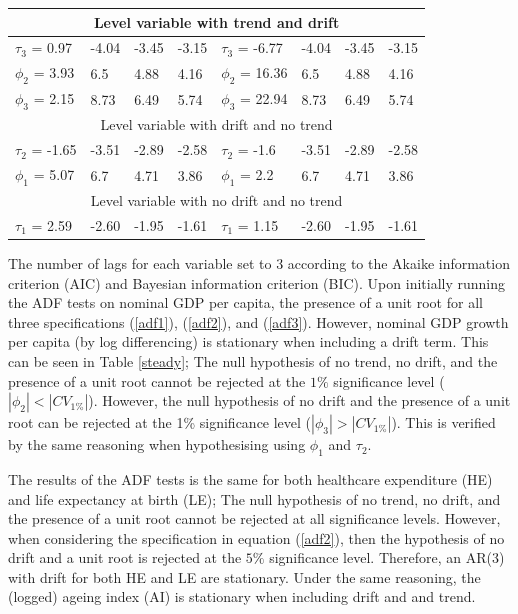 \documentclass[11pt,preprint, authoryear]{elsarticle}
\numberwithin{equation}{section}
\numberwithin{figure}{section}
\numberwithin{table}{section}
\begin{document}
\begin{small}
\begin{longtable}{|llll|||llll|}
\hline
\multicolumn{8}{|c|}{Level variable with trend and drift}\\
\hline
  $\tau_3$ = 0.97 &  -4.04   & -3.45   & -3.15 & $\tau_3$ = -6.77  &  -4.04   & -3.45   & -3.15 \\
  $\phi_2$ = 3.93 &   6.5    & 4.88    &  4.16  & $\phi_2$ = 16.36 &   6.5    & 4.88    &  4.16    \\
  $\phi_3$ = 2.15     &   8.73   & 6.49    &  5.74  &  $\phi_3$ = 22.94  &   8.73   & 6.49    &  5.74   \\
\hline
  \multicolumn{8}{|c|}{Level variable with drift and no trend}\\
\hline
  $\tau_2$ = -1.65 & -3.51  & -2.89  & -2.58  & $\tau_2$ = -1.6 & -3.51  & -2.89  & -2.58  \\
  $\phi_1$ = 5.07 &    6.7       & 4.71     & 3.86  & $\phi_1$ =  2.2  &    6.7       & 4.71     & 3.86  \\
\hline
  \multicolumn{8}{|c|}{Level variable with no drift and no trend}\\
\hline
  $\tau_1$ = 2.59 & -2.60  & -1.95 & -1.61  & $\tau_1$ = 1.15 & -2.60  & -1.95 & -1.61   \\
\hline%
\end{longtable}
\end{small}

The number of lags for each variable set to 3 according to the Akaike
information criterion (AIC) and Bayesian information criterion (BIC).
Upon initially running the ADF tests on nominal GDP per capita, the
presence of a unit root for all three specifications (\ref{adf1}),
(\ref{adf2}), and (\ref{adf3}). However, nominal GDP growth per capita
(by log differencing) is stationary when including a drift term. This
can be seen in Table \ref{steady}; The null hypothesis of no trend, no
drift, and the presence of a unit root cannot be rejected at the
\(1 \%\) significance level (\(|\phi_2| < |CV_{1\%}|\)). However, the
null hypothesis of no drift and the presence of a unit root can be
rejected at the 1\% significance level (\(|\phi_3| > |CV_{1\%}|\)). This
is verified by the same reasoning when hypothesising using \(\phi_1\)
and \(\tau_2\).

The results of the ADF tests is the same for both healthcare expenditure
(HE) and life expectancy at birth (LE); The null hypothesis of no trend,
no drift, and the presence of a unit root cannot be rejected at all
significance levels. However, when considering the specification in
equation (\ref{adf2}), then the hypothesis of no drift and a unit root
is rejected at the \(5\%\) significance level. Therefore, an AR(3) with
drift for both HE and LE are stationary. Under the same reasoning, the
(logged) ageing index (AI) is stationary when including drift and and
trend.
\end{document}
